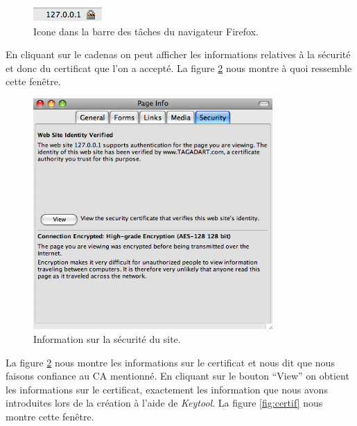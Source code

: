 \documentclass[10pt,a4paper,titlepage]{article}
\begin{document}
\begin{figure}[htbp]
   \begin{center}
      \includegraphics[height=23px]{img/2.png}
   \end{center}
   \caption{Icone dans la barre des tâches du navigateur Firefox.}
	\label{fig:icone}
\end{figure}

En cliquant sur le cadenas on peut afficher les informations relatives à la sécurité et donc du certificat que l'on a accepté. La figure \ref{fig:infosecu} nous montre à quoi ressemble cette fenêtre.

\begin{figure}[htbp]
   \begin{center}
      \includegraphics[width=345px]{img/3.png}
   \end{center}
   \caption{Information sur la sécurité du site.}
	\label{fig:infosecu}
\end{figure}

La figure \ref{fig:infosecu} nous montre les informations sur le certificat et nous dit que nous faisons confiance au CA mentionné. En cliquant sur le bouton “View” on obtient les informations sur le certificat, exactement les information que nous avons introduites lors de la création à l'aide de \emph{Keytool}. La figure \ref{fig:certif} nous montre cette fenêtre.
\end{document}
